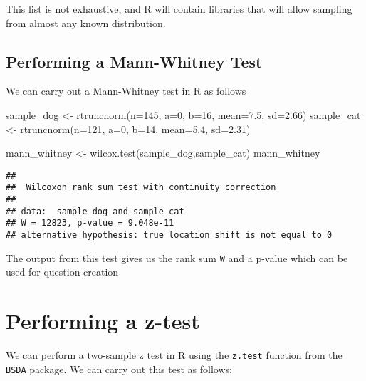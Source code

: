 \documentclass[
]{book}
\newenvironment{Shaded}{\begin{snugshade}}{\end{snugshade}}
\newcommand{\AttributeTok}[1]{\textcolor[rgb]{0.77,0.63,0.00}{#1}}
\newcommand{\DecValTok}[1]{\textcolor[rgb]{0.00,0.00,0.81}{#1}}
\newcommand{\FloatTok}[1]{\textcolor[rgb]{0.00,0.00,0.81}{#1}}
\newcommand{\FunctionTok}[1]{\textcolor[rgb]{0.00,0.00,0.00}{#1}}
\newcommand{\NormalTok}[1]{#1}
\newcommand{\OtherTok}[1]{\textcolor[rgb]{0.56,0.35,0.01}{#1}}
\begin{document}
This list is not exhaustive, and R will contain libraries that will allow sampling from almost any known distribution.

\hypertarget{performing-a-mann-whitney-test}{%
\subsection{Performing a Mann-Whitney Test}\label{performing-a-mann-whitney-test}}

We can carry out a Mann-Whitney test in R as follows

\begin{Shaded}
\begin{Highlighting}[]
\NormalTok{sample\_dog }\OtherTok{\textless{}{-}} \FunctionTok{rtruncnorm}\NormalTok{(}\AttributeTok{n=}\DecValTok{145}\NormalTok{, }\AttributeTok{a=}\DecValTok{0}\NormalTok{, }\AttributeTok{b=}\DecValTok{16}\NormalTok{, }\AttributeTok{mean=}\FloatTok{7.5}\NormalTok{, }\AttributeTok{sd=}\FloatTok{2.66}\NormalTok{)}
\NormalTok{sample\_cat }\OtherTok{\textless{}{-}} \FunctionTok{rtruncnorm}\NormalTok{(}\AttributeTok{n=}\DecValTok{121}\NormalTok{, }\AttributeTok{a=}\DecValTok{0}\NormalTok{, }\AttributeTok{b=}\DecValTok{14}\NormalTok{, }\AttributeTok{mean=}\FloatTok{5.4}\NormalTok{, }\AttributeTok{sd=}\FloatTok{2.31}\NormalTok{)}

\NormalTok{mann\_whitney }\OtherTok{\textless{}{-}} \FunctionTok{wilcox.test}\NormalTok{(sample\_dog,sample\_cat)}
\NormalTok{mann\_whitney}
\end{Highlighting}
\end{Shaded}

\begin{verbatim}
## 
##  Wilcoxon rank sum test with continuity correction
## 
## data:  sample_dog and sample_cat
## W = 12823, p-value = 9.048e-11
## alternative hypothesis: true location shift is not equal to 0
\end{verbatim}

The output from this test gives us the rank sum \texttt{W} and a p-value which can be used for question creation

\hypertarget{performing-a-z-test}{%
\section{Performing a z-test}\label{performing-a-z-test}}

We can perform a two-sample z test in R using the \texttt{z.test} function from the \texttt{BSDA} package. We can carry out this test as follows:
\end{document}
